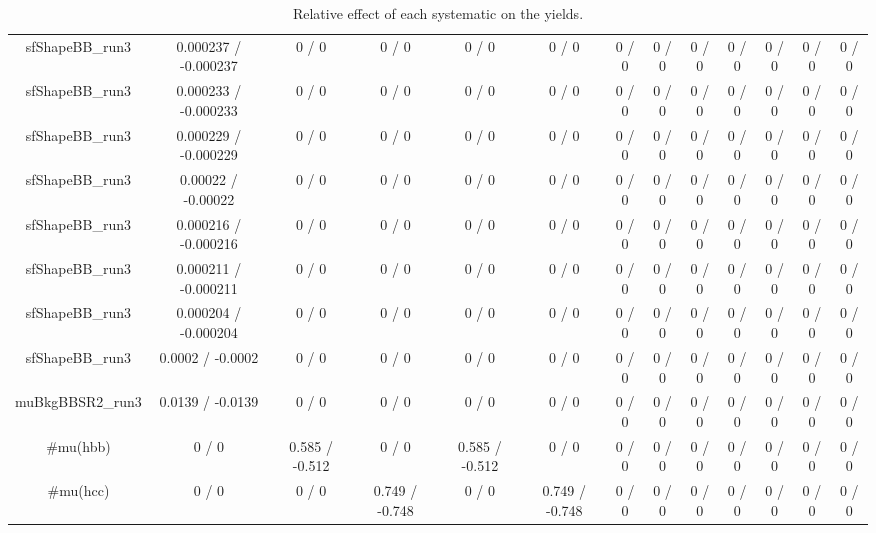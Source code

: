 \documentclass[10pt]{article}
\begin{document}
\begin{table}[htbp]
\begin{center}
\begin{tabular}{|c|c|c|c|c|c|c|c|c|c|c|c|c|}
  sfShapeBB_run3 & 0.000237 / -0.000237 & 0 / 0 & 0 / 0 & 0 / 0 & 0 / 0 & 0 / 0 & 0 / 0 & 0 / 0 & 0 / 0 & 0 / 0 & 0 / 0 & 0 / 0 \\ 
  sfShapeBB_run3 & 0.000233 / -0.000233 & 0 / 0 & 0 / 0 & 0 / 0 & 0 / 0 & 0 / 0 & 0 / 0 & 0 / 0 & 0 / 0 & 0 / 0 & 0 / 0 & 0 / 0 \\ 
  sfShapeBB_run3 & 0.000229 / -0.000229 & 0 / 0 & 0 / 0 & 0 / 0 & 0 / 0 & 0 / 0 & 0 / 0 & 0 / 0 & 0 / 0 & 0 / 0 & 0 / 0 & 0 / 0 \\ 
  sfShapeBB_run3 & 0.00022 / -0.00022 & 0 / 0 & 0 / 0 & 0 / 0 & 0 / 0 & 0 / 0 & 0 / 0 & 0 / 0 & 0 / 0 & 0 / 0 & 0 / 0 & 0 / 0 \\ 
  sfShapeBB_run3 & 0.000216 / -0.000216 & 0 / 0 & 0 / 0 & 0 / 0 & 0 / 0 & 0 / 0 & 0 / 0 & 0 / 0 & 0 / 0 & 0 / 0 & 0 / 0 & 0 / 0 \\ 
  sfShapeBB_run3 & 0.000211 / -0.000211 & 0 / 0 & 0 / 0 & 0 / 0 & 0 / 0 & 0 / 0 & 0 / 0 & 0 / 0 & 0 / 0 & 0 / 0 & 0 / 0 & 0 / 0 \\ 
  sfShapeBB_run3 & 0.000204 / -0.000204 & 0 / 0 & 0 / 0 & 0 / 0 & 0 / 0 & 0 / 0 & 0 / 0 & 0 / 0 & 0 / 0 & 0 / 0 & 0 / 0 & 0 / 0 \\ 
  sfShapeBB_run3 & 0.0002 / -0.0002 & 0 / 0 & 0 / 0 & 0 / 0 & 0 / 0 & 0 / 0 & 0 / 0 & 0 / 0 & 0 / 0 & 0 / 0 & 0 / 0 & 0 / 0 \\ 
  muBkgBBSR2_run3 & 0.0139 / -0.0139 & 0 / 0 & 0 / 0 & 0 / 0 & 0 / 0 & 0 / 0 & 0 / 0 & 0 / 0 & 0 / 0 & 0 / 0 & 0 / 0 & 0 / 0 \\ 
  #mu(hbb) & 0 / 0 & 0.585 / -0.512 & 0 / 0 & 0.585 / -0.512 & 0 / 0 & 0 / 0 & 0 / 0 & 0 / 0 & 0 / 0 & 0 / 0 & 0 / 0 & 0 / 0 \\ 
  #mu(hcc) & 0 / 0 & 0 / 0 & 0.749 / -0.748 & 0 / 0 & 0.749 / -0.748 & 0 / 0 & 0 / 0 & 0 / 0 & 0 / 0 & 0 / 0 & 0 / 0 & 0 / 0 \\ 
\hline 
\end{tabular} 
\caption{Relative effect of each systematic on the yields.} 
\end{center} 
\end{table} 
\end{document}
